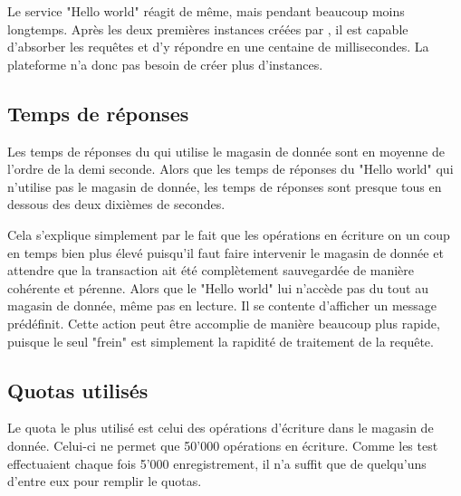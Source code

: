 \documentclass[french]{msereport}
\newcommand{\gae}{\brand{Google App Engine}}
\begin{document}
			
			Le service "Hello world" réagit de même, mais pendant beaucoup moins longtemps. Après les deux premières instances créées par \gae, il est capable d'absorber les requêtes et d'y répondre en une centaine de millisecondes. La plateforme n'a donc pas besoin de créer plus d'instances.

				
		\subsection{Temps de réponses}
			Les temps de réponses du  qui utilise le magasin de donnée sont en moyenne de l'ordre de la demi seconde. Alors que les temps de réponses du  "Hello world" qui n'utilise pas le magasin de donnée, les temps de réponses sont presque tous en dessous des deux dixièmes de secondes.
			
			Cela s'explique simplement par le fait que les opérations en écriture on un coup en temps bien plus élevé puisqu'il faut faire intervenir le magasin de donnée et attendre que la transaction ait été complètement sauvegardée de manière cohérente et pérenne. Alors que le "Hello world" lui n'accède pas du tout au magasin de donnée, même pas en lecture. Il se contente d'afficher un message prédéfinit. Cette action peut être accomplie de manière beaucoup plus rapide, puisque le seul "frein" est simplement la rapidité de traitement de la requête.
			
		\subsection{Quotas utilisés}
			
			Le quota le plus utilisé est celui des opérations d'écriture dans le magasin de donnée. Celui-ci ne permet que 50'000 opérations en écriture. Comme les test effectuaient chaque fois 5'000 enregistrement, il n'a suffit que de quelqu'uns d'entre eux pour remplir le quotas.
			
\end{document}
